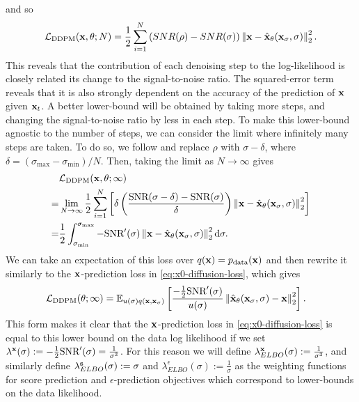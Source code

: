 and so
\begin{align}
    {\mathcal{L}}_\text{DDPM}({\mathbf{x}}, \theta; N) = \frac{1}{2} \sum_{i=1}^N \left( SNR(\rho) - SNR(\sigma) \right) \left\| {\mathbf{x}} - \hat{{\mathbf{x}}}_\theta({\mathbf{x}}_\sigma, \sigma) \right\|_2^2.
\end{align}
This reveals that the contribution of each denoising step to the log-likelihood is closely related its change to the signal-to-noise ratio. The squared-error term reveals that it is also strongly dependent on the accuracy of the prediction of ${\mathbf{x}}$ given ${\mathbf{x}}_t$. A better lower-bound will be obtained by taking more steps, and changing the signal-to-noise ratio by less in each step. To make this lower-bound agnostic to the number of steps, we can consider the limit where infinitely many steps are taken. To do so, we  follow \citet{kingma2021variational} and replace $\rho$ with $\sigma-\delta$, where $\delta = (\sigma_\text{max}-\sigma_\text{min}) / N$. Then, taking the limit as $N \rightarrow \infty$ gives 
\begin{align}
    &{\mathcal{L}}_\text{DDPM}({\mathbf{x}}, \theta; \infty) \\
    = &\lim_{N\rightarrow\infty}  \frac{1}{2} \sum_{i=1}^N \left[ \delta \left( \frac{\text{SNR}(\sigma-\delta) - \text{SNR}(\sigma)}{\delta} \right) \left\| {\mathbf{x}} - \hat{{\mathbf{x}}}_\theta({\mathbf{x}}_\sigma, \sigma) \right\|_2^2 \right] \\
    = &\frac{1}{2} \int_{\sigma_\text{min}}^{\sigma_\text{max}} -\text{SNR}'(\sigma) \left\| {\mathbf{x}} - \hat{{\mathbf{x}}}_\theta({\mathbf{x}}_\sigma, \sigma) \right\|_2^2 \mathrm{d}\sigma \label{eq:diffusion-elbo}.
\end{align}
We can take an expectation of this loss over $q({\mathbf{x}})=p_{\rm{data}}({\mathbf{x}})$ and then rewrite it similarly to the ${\mathbf{x}}$-prediction loss in \cref{eq:x0-diffusion-loss}, which gives
\begin{align} \label{eq:diffusion-loss-likelihood}
    {\mathcal{L}}_\text{DDPM}(\theta; \infty) &= \mathbb{E}_{u(\sigma)q({\mathbf{x}}, {\mathbf{x}}_\sigma)} \left[ 
    \frac{-\frac{1}{2}\text{SNR}'(\sigma)}{u(\sigma)}
    \left\| \hat{{\mathbf{x}}}_\theta({\mathbf{x}}_\sigma, \sigma) - {\mathbf{x}} \right\|_2^2 \right].
\end{align}
This form makes it clear that the ${\mathbf{x}}$-prediction loss in \cref{eq:x0-diffusion-loss} is equal to this lower bound on the data log likelihood if we set $\lambda^{\mathbf{x}}(\sigma) := - \frac{1}{2} \text{SNR}'(\sigma) = \frac{1}{\sigma^3}$. For this reason we will define $\lambda^{\mathbf{x}}_{ELBO}(\sigma) := \frac{1}{\sigma^3}$, and similarly define $\lambda^{\mathbf{s}}_{ELBO}(\sigma) := \sigma$ and $\lambda^\epsilon_{ELBO}(\sigma) := \frac{1}{\sigma}$ as the weighting functions for score prediction and $\epsilon$-prediction objectives which correspond to lower-bounds on the data likelihood.

